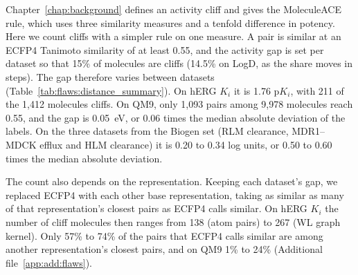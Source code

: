 

Chapter~\ref{chap:background} defines an activity cliff and gives the MoleculeACE rule, which uses three similarity measures and a tenfold difference in potency. Here we count cliffs with a simpler rule on one measure. A pair is similar at an ECFP4 Tanimoto similarity of at least 0.55, and the activity gap is set per dataset so that 15\% of molecules are cliffs (14.5\% on LogD, as the share moves in steps). The gap therefore varies between datasets (Table~\ref{tab:flaws:distance_summary}). On hERG $K_i$ it is 1.76 p$K_i$, with 211 of the 1,412 molecules cliffs. On QM9, only 1,093 pairs among 9,978 molecules reach 0.55, and the gap is 0.05~eV, or 0.06 times the median absolute deviation of the labels. On the three datasets from the Biogen set (RLM clearance, MDR1--MDCK efflux and HLM clearance) it is 0.20 to 0.34 log units, or 0.50 to 0.60 times the median absolute deviation.

The count also depends on the representation. Keeping each dataset's gap, we replaced ECFP4 with each other base representation, taking as similar as many of that representation's closest pairs as ECFP4 calls similar. On hERG $K_i$ the number of cliff molecules then ranges from 138 (atom pairs) to 267 (WL graph kernel). Only 57\% to 74\% of the pairs that ECFP4 calls similar are among another representation's closest pairs, and on QM9 1\% to 24\% (Additional file~\ref{app:add:flaws}).

